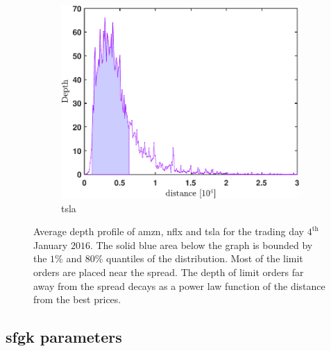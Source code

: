 \documentclass[11pt, a4paper]{thesis}  %
\begin{document}
\begin{figure}[htp]
	\begin{subfigure}[b]{0.5\textwidth}
    	\includegraphics[width=\textwidth]{./AverageDepthProfile/TSLA/average_depth_profile.pdf}
		\caption{\ac{tsla}}
        \label{figure:average_depth:tsla}
	\end{subfigure}
	
	\caption{Average depth profile of \ac{amzn}, \ac{nflx} and \ac{tsla} for the trading day 
	$4^\textrm{th}$ January $2016$. The solid blue area below the graph is bounded by the $1$\% and $80$\% 
	quantiles of the distribution. Most of the limit orders are placed near the spread. The depth of limit orders far away from the spread decays as a power law function of the distance from the best prices.}
	\label{figure:averaged_depth_profile}
	
\end{figure}
%
%
\subsection{\ac{sfgk} parameters}
\end{document}
